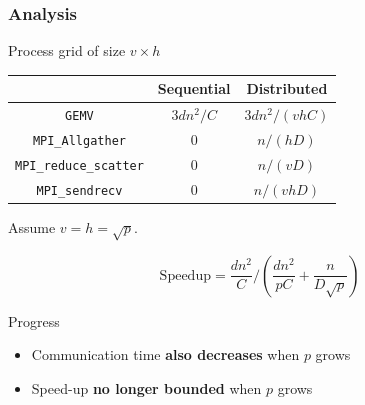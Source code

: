 \documentclass[xcolor={x11names,svgnames},x11names,svgnames]{beamer}
\begin{document}
\begin{frame}[label=2d]
  \frametitle{Analysis}

  Process grid of size $v \times h$
  
  \begin{center}
    \begin{tabular}{|c||c|c|}
      \hline
      & Sequential & Distributed \\
      \hline\hline
      \texttt{GEMV}                 & $3 d n^2 / C$ & $3 d n^2 / (vhC)$ \\
      \hline
      \texttt{MPI\_Allgather}       & 0             & $n / (hD)$ \\
      \hline
      \texttt{MPI\_reduce\_scatter} & 0             & $n / (vD)$ \\
      \hline
      \texttt{MPI\_sendrecv}        & 0             & $n / (vhD)$ \\
      \hline
    \end{tabular}
  \end{center}

  Assume $v = h = \sqrt{p}$.
  
  \[
    \mathrm{Speedup} = \frac{d n^2}{C} / (\frac{d n^2}{pC} + \frac{n}{D\sqrt{p}})
  \]

  \begin{alertblock}{Progress}
    \begin{itemize}
    \item Communication time \textbf{also decreases} when $p$ grows
    \item Speed-up \textbf{no longer bounded} when $p$ grows
    \end{itemize}
  \end{alertblock}
  
\end{frame}
\end{document}
